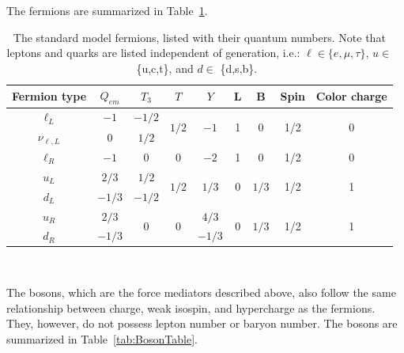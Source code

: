 The fermions are summarized in Table~\ref{tab:FermionTable}.



\begin{table}[!Hhtbp]
\begin{tabular}{|c|cccc|cc|c|c|}
\hline
{Fermion type}  & {$Q_{em}$}& {$T_{3}$}& {$T$} &{$Y$} & {L}& {B} &{Spin} &{Color charge}\\
\hline
\hline
{$\ell_{L}$}  & {$-1$}& {$-1/2$}& \multirow{2}{*}{$1/2$} &\multirow{2}{*}{$-1$} & \multirow{2}{*}{1}& \multirow{2}{*}{0} &\multirow{2}{*}{1/2} &\multirow{2}{*}{0}\\
{$\nu_{\ell,L}$}  & {$0$}& {$1/2$}& {} &{} & {}& {} &{} &{}\\
\hline
{$\ell_{R}$}  & {$-1$}& {$0$}& {$0$} &{$-2$} & {1}& {0} &{1/2} &{0}\\
\hline
{$u_{L}$}  & {$2/3$}& {$1/2$}& \multirow{2}{*}{$1/2$} &\multirow{2}{*}{$1/3$} & \multirow{2}{*}{0}& \multirow{2}{*}{$1/3$} &\multirow{2}{*}{1/2} &\multirow{2}{*}{1}\\
{$d_{L}$}  & {$-1/3$}& {$-1/2$}& {} &{} & {}& {} &{} &{}\\
\hline
{$u_{R}$}  & {$2/3$}& \multirow{2}{*}{$0$}& \multirow{2}{*}{$0$} &{$4/3$} & \multirow{2}{*}{0}& \multirow{2}{*}{$1/3$} &\multirow{2}{*}{1/2} &\multirow{2}{*}{1}\\
{$d_{R}$}  & {$-1/3$}& {}& {} &{$-1/3$} & {}& {} &{} &{}\\
\hline


\end{tabular}
\\
\caption[The fermions and their quantum numbers]{The standard model fermions, listed with their quantum numbers.  Note that leptons and quarks are listed independent of generation, i.e.: $\ell \in \{e,\mu,\tau\}$, $u \in $ \{u,c,t\}, and $d \in $ \{d,s,b\}.~\cite{PhysRevD.86.010001,HalzenAndMartin}}
\label{tab:FermionTable}
\end{table}


The bosons, which are the force mediators described above, also follow the same relationship between charge, weak isospin, and hypercharge as the fermions.  They, however, do not possess lepton number or baryon number.  The bosons are summarized in Table~\ref{tab:BosonTable}.




